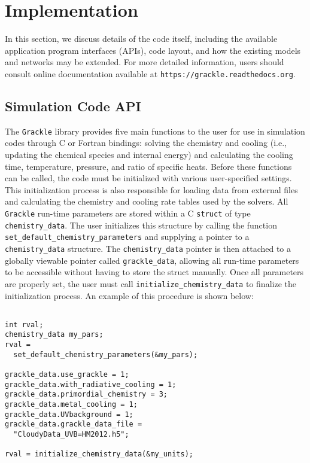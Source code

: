 \section{Implementation} \label{methods:code}

In this section, we discuss details of the code itself, including the
available application program interfaces (APIs), code layout, and how
the existing models and networks may be extended.  For more detailed
information, users should consult online documentation available at
\texttt{https://grackle.readthedocs.org}.

\subsection{Simulation Code API} \label{methods:api}

The \texttt{Grackle} library provides five main functions to the user
for use in simulation codes through C or Fortran bindings: solving the
chemistry and cooling (i.e., updating the chemical species and
internal energy) and calculating the cooling time, temperature,
pressure, and ratio of specific heats.  Before these functions can be
called, the code must be initialized with various user-specified
settings.  This initialization process is also responsible for loading
data from external files and calculating the chemistry and cooling
rate tables used by the solvers.  All \texttt{Grackle} run-time
parameters are stored within a C \texttt{struct} of type
\texttt{chemistry\_data}.  The user initializes this structure by
calling the function \texttt{set\_default\_chemistry\_parameters} and
supplying a pointer to a \texttt{chemistry\_data} structure.  The
\texttt{chemistry\_data} pointer is then attached to a globally
viewable pointer called \texttt{grackle\_data}, allowing all run-time
parameters to be accessible without having to store the struct
manually.  Once all parameters are properly set, the user must call
\texttt{initialize\_chemistry\_data} to finalize the initialization
process.  An example of this procedure is shown below:

\vspace{0.5cm}
\begin{minipage}[b]{0.5\linewidth}
\begin{verbatim}

int rval;
chemistry_data my_pars;
rval =
  set_default_chemistry_parameters(&my_pars);

grackle_data.use_grackle = 1;
grackle_data.with_radiative_cooling = 1;
grackle_data.primordial_chemistry = 3;
grackle_data.metal_cooling = 1;
grackle_data.UVbackground = 1;
grackle_data.grackle_data_file = 
  "CloudyData_UVB=HM2012.h5";

rval = initialize_chemistry_data(&my_units);

\end{verbatim}
\end{minipage}

